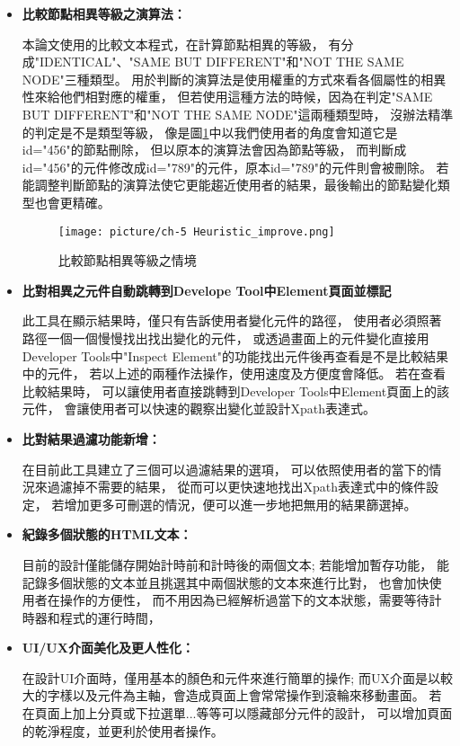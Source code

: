 \begin{itemize}
\item\textbf{比較節點相異等級之演算法：}

本論文使用的比較文本程式，在計算節點相異的等級，
有分成"IDENTICAL"、"SAME BUT DIFFERENT"和"NOT THE SAME NODE"三種類型。
用於判斷的演算法是使用權重的方式來看各個屬性的相異性來給他們相對應的權重，
但若使用這種方法的時候，因為在判定"SAME BUT DIFFERENT"和"NOT THE SAME NODE"這兩種類型時，
沒辦法精準的判定是不是類型等級，
像是圖\ref{f5.1}中以我們使用者的角度會知道它是id="456"的節點刪除，
但以原本的演算法會因為節點等級，
而判斷成id="456"的元件修改成id="789"的元件，原本id="789"的元件則會被刪除。
若能調整判斷節點的演算法使它更能趨近使用者的結果，最後輸出的節點變化類型也會更精確。

\indent
\begin{figure}[H]
    \centering
    \texttt{[image: picture/ch-5 Heuristic\_improve.png]}
    \caption{比較節點相異等級之情境}
    \label{f5.1}
\end{figure}

\item\textbf{比對相異之元件自動跳轉到Develope Tool中Element頁面並標記}

此工具在顯示結果時，僅只有告訴使用者變化元件的路徑，
使用者必須照著路徑一個一個慢慢找出找出變化的元件，
或透過畫面上的元件變化直接用Developer Tools中"Inspect Element"的功能找出元件後再查看是不是比較結果中的元件，
若以上述的兩種作法操作，使用速度及方便度會降低。
若在查看比較結果時，
可以讓使用者直接跳轉到Developer Tools中Element頁面上的該元件，
會讓使用者可以快速的觀察出變化並設計Xpath表達式。

\item\textbf{比對結果過濾功能新增：}

在目前此工具建立了三個可以過濾結果的選項，
可以依照使用者的當下的情況來過濾掉不需要的結果，
從而可以更快速地找出Xpath表達式中的條件設定，
若增加更多可刪選的情況，便可以進一步地把無用的結果篩選掉。

\item\textbf{紀錄多個狀態的HTML文本：}

目前的設計僅能儲存開始計時前和計時後的兩個文本;
若能增加暫存功能，
能記錄多個狀態的文本並且挑選其中兩個狀態的文本來進行比對，
也會加快使用者在操作的方便性，
而不用因為已經解析過當下的文本狀態，需要等待計時器和程式的運行時間，


\item\textbf{UI/UX介面美化及更人性化：}

在設計UI介面時，僅用基本的顏色和元件來進行簡單的操作;
而UX介面是以較大的字樣以及元件為主軸，會造成頁面上會常常操作到滾輪來移動畫面。
若在頁面上加上分頁或下拉選單...等等可以隱藏部分元件的設計，
可以增加頁面的乾淨程度，並更利於使用者操作。

\end{itemize}